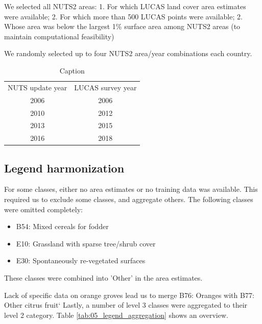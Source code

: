 We selected all NUTS2 areas:
1. For which LUCAS land cover area estimates were available;
2. For which more than 500 LUCAS points were available;
2. Whose area was below the largest 1\% surface area among NUTS2 areas (to maintain computational feasibility)

We randomly selected up to four NUTS2 area/year combinations each country.

\begin{table}[H]
    \centering
    \begin{tabular}{c|c}
         NUTS update year &  LUCAS survey year\\
         2006 & 2006 \\
         2010 & 2012 \\
         2013 & 2015 \\
         2016 & 2018 \\
    \end{tabular}
    \caption{Caption}
    \label{tab:05_NUTS_LUCAS}
\end{table}

\subsection{Legend harmonization}
For some classes, either no area estimates or no training data was available. This required us to exclude some classes, and aggregate others. The following classes were omitted completely:
\begin{itemize}
    \item B54: Mixed cereals for fodder
    \item E10: Grassland with sparse tree/shrub cover
    \item E30: Spontaneously re-vegetated surfaces
\end{itemize}
These classes were combined into 'Other' in the area estimates.

Lack of specific data on orange groves lead us to merge B76: Oranges with B77: Other citrus fruit`
Lastly, a number of level 3 classes were aggregated to their level 2 category. Table \ref{tab:05_legend_aggregation} shows an overview.

